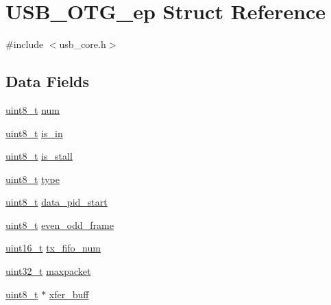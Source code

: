 \hypertarget{struct_u_s_b___o_t_g__ep}{\section{U\-S\-B\-\_\-\-O\-T\-G\-\_\-ep Struct Reference}
\label{struct_u_s_b___o_t_g__ep}
}


{\ttfamily \#include $<$usb\-\_\-core.\-h$>$}

\subsection*{Data Fields}
\begin{DoxyCompactItemize}
\item 
\hyperlink{stdint_8h_aba7bc1797add20fe3efdf37ced1182c5}{uint8\-\_\-t} \hyperlink{struct_u_s_b___o_t_g__ep_ae9b1ada461084c72b59776a4c22cbf44}{num}
\item 
\hyperlink{stdint_8h_aba7bc1797add20fe3efdf37ced1182c5}{uint8\-\_\-t} \hyperlink{struct_u_s_b___o_t_g__ep_aecb6ffaf54ac00c53f8ffb96f8c4443c}{is\-\_\-in}
\item 
\hyperlink{stdint_8h_aba7bc1797add20fe3efdf37ced1182c5}{uint8\-\_\-t} \hyperlink{struct_u_s_b___o_t_g__ep_a361738459c6c935bad498f62a8c87346}{is\-\_\-stall}
\item 
\hyperlink{stdint_8h_aba7bc1797add20fe3efdf37ced1182c5}{uint8\-\_\-t} \hyperlink{struct_u_s_b___o_t_g__ep_a8bd2a2f083f2bab19edffccf6e1b07db}{type}
\item 
\hyperlink{stdint_8h_aba7bc1797add20fe3efdf37ced1182c5}{uint8\-\_\-t} \hyperlink{struct_u_s_b___o_t_g__ep_a2c4c55139290535d3e4866fe59d9bf54}{data\-\_\-pid\-\_\-start}
\item 
\hyperlink{stdint_8h_aba7bc1797add20fe3efdf37ced1182c5}{uint8\-\_\-t} \hyperlink{struct_u_s_b___o_t_g__ep_af06202854934b452780f604d4b75d434}{even\-\_\-odd\-\_\-frame}
\item 
\hyperlink{stdint_8h_a273cf69d639a59973b6019625df33e30}{uint16\-\_\-t} \hyperlink{struct_u_s_b___o_t_g__ep_afcd3fbb769429805d98bcfc574655df5}{tx\-\_\-fifo\-\_\-num}
\item 
\hyperlink{stdint_8h_a435d1572bf3f880d55459d9805097f62}{uint32\-\_\-t} \hyperlink{struct_u_s_b___o_t_g__ep_a212a39c3f28c474e617f49b7a81206d7}{maxpacket}
\item 
\hyperlink{stdint_8h_aba7bc1797add20fe3efdf37ced1182c5}{uint8\-\_\-t} $\ast$ \hyperlink{struct_u_s_b___o_t_g__ep_af4a3c53a97b4da1a69cab2fb7101a656}{xfer\-\_\-buff}
\item 

\end{DoxyCompactItemize}
